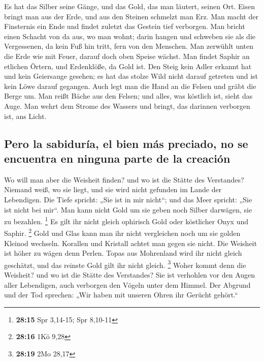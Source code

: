  Es hat das Silber seine Gänge, und das Gold, das man
läutert, seinen Ort.  Eisen bringt man aus der Erde, und
aus den Steinen schmelzt man Erz.  Man macht der
Finsternis ein Ende und findet zuletzt das Gestein tief verborgen.
 Man bricht einen Schacht von da aus, wo man wohnt; darin
hangen und schweben sie als die Vergessenen, da kein Fuß hin tritt, fern
von den Menschen.  Man zerwühlt unten die Erde wie mit
Feuer, darauf doch oben Speise wächst.  Man findet Saphir
an etlichen Örtern, und Erdenklöße, da Gold ist.  Den
Steig kein Adler erkannt hat und kein Geiersauge gesehen; 
es hat das stolze Wild nicht darauf getreten und ist kein Löwe darauf
gegangen.  Auch legt man die Hand an die Felsen und gräbt
die Berge um.  Man reißt Bäche aus den Felsen; und alles,
was köstlich ist, sieht das Auge.  Man wehrt dem Strome
des Wassers und bringt, das darinnen verborgen ist, ans Licht.

\hypertarget{pero-la-sabiduruxeda-el-bien-muxe1s-preciado-no-se-encuentra-en-ninguna-parte-de-la-creaciuxf3n}{%
\subsection{Pero la sabiduría, el bien más preciado, no se encuentra en
ninguna parte de la
creación}\label{pero-la-sabiduruxeda-el-bien-muxe1s-preciado-no-se-encuentra-en-ninguna-parte-de-la-creaciuxf3n}}

 Wo will man aber die Weisheit finden? und wo ist die
Stätte des Verstandes?  Niemand weiß, wo sie liegt, und
sie wird nicht gefunden im Lande der Lebendigen.  Die
Tiefe spricht: „Sie ist in mir nicht``; und das Meer spricht: „Sie ist
nicht bei mir``.  Man kann nicht Gold um sie geben noch
Silber darwägen, sie zu bezahlen. \footnote{\textbf{28:15} Spr 3,14-15;
  Spr 8,10-11}  Es gilt ihr nicht gleich ophirisch Gold
oder köstlicher Onyx und Saphir. \footnote{\textbf{28:16} 1Kö 9,28}
 Gold und Glas kann man ihr nicht vergleichen noch um sie
golden Kleinod wechseln.  Korallen und Kristall achtet
man gegen sie nicht. Die Weisheit ist höher zu wägen denn Perlen.
 Topas aus Mohrenland wird ihr nicht gleich geschätzt,
und das reinste Gold gilt ihr nicht gleich. \footnote{\textbf{28:19} 2Mo
  28,17}  Woher kommt denn die Weisheit? und wo ist die
Stätte des Verstandes?  Sie ist verhohlen vor den Augen
aller Lebendigen, auch verborgen den Vögeln unter dem Himmel.
 Der Abgrund und der Tod sprechen: „Wir haben mit unseren
Ohren ihr Gerücht gehört.``

